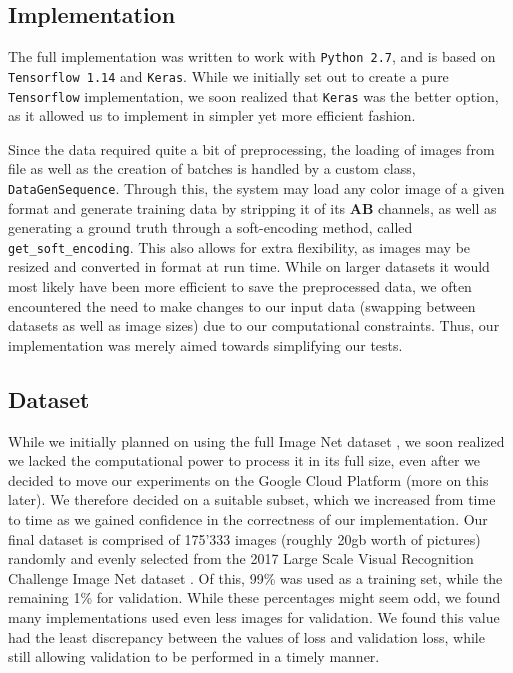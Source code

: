 \documentclass[twoside,twocolumn]{article}
\begin{document}
\subsection{Implementation}

The full implementation was written to work with \texttt{Python 2.7}, and is based on \texttt{Tensorflow 1.14} and \texttt{Keras}. While we initially set out to create a pure \texttt{Tensorflow} implementation, we soon realized that \texttt{Keras} was the better option, as it allowed us to implement in simpler yet more efficient fashion.

Since the data required quite a bit of preprocessing, the loading of images from file as well as the creation of batches is handled by a custom class, \texttt{DataGenSequence}. Through this, the system may load any color image of a given format and generate training data by stripping it of its \textbf{AB} channels, as well as generating a ground truth through a soft-encoding method, called \texttt{get\_soft\_encoding}. This also allows for extra flexibility, as images may be resized and converted in format at run time. While on larger datasets it would most likely have been more efficient to save the preprocessed data, we often encountered the need to make changes to our input data (swapping between datasets as well as image sizes) due to our computational constraints. Thus, our implementation was merely aimed towards simplifying our tests.


\subsection{Dataset}

While we initially planned on using the full Image Net dataset \cite{Imagenet}, we soon realized we lacked the computational power to process it in its full size, even after we decided to move our experiments on the Google Cloud Platform \cite{GCP} (more on this later). We therefore decided on a suitable subset, which we increased from time to time as we gained confidence in the correctness of our implementation. Our final dataset is comprised of 175’333 images (roughly 20gb worth of pictures) randomly and evenly selected from the 2017 Large Scale Visual Recognition Challenge Image Net dataset \cite{ImNetChallenge:2017}. Of this, 99\% was used as a training set, while the remaining 1\% for validation. While these percentages might seem odd, we found many implementations used even less images for validation. We found this value had the least discrepancy between the values of loss and validation loss, while still allowing validation to be performed in a timely manner.
\end{document}
